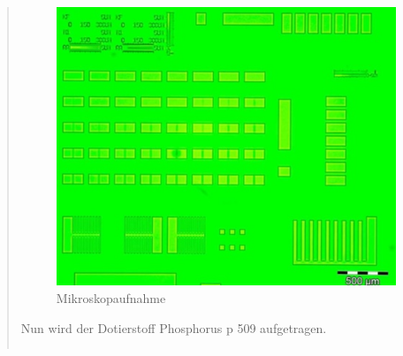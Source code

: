 \begin{quote}
    		\begin{figure}[H]
				\hspace{4.7 cm}
                \includegraphics[scale=0.5, trim = 0cm 0cm 0cm 0cm,clip]
                	{./HerstellungBilder/Mikroskopbild1.png}
                  \caption{Mikroskopaufnahme}
                \label{fig:mikro1}
            \end{figure}

    	\vspace{2em}

    	Nun wird der Dotierstoff Phosphorus p 509 aufgetragen.

    	\vspace{2em}

    	\begin{center}
                \begin{tabular}{ll}


\end{tabular}
\end{center}
\end{quote}

